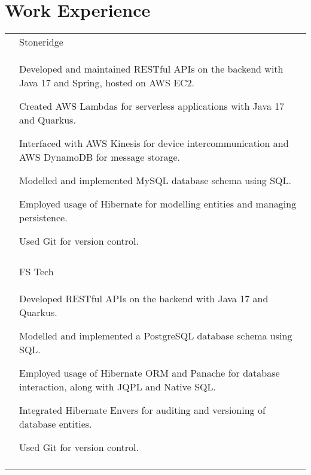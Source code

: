 \documentclass[a4paper,12pt]{article}
\begin{document}
\section{Work Experience}
\begin{longtable}{r|p{14.3cm}}

& Stoneridge \\*
&\small{
\begin{itemize*}[label=\Large\textbullet]
    \item Developed and maintained RESTful APIs on the backend with Java 17 and Spring, hosted on AWS EC2.
    \item Created AWS Lambdas for serverless applications with Java 17 and Quarkus.
    \item Interfaced with AWS Kinesis for device intercommunication and AWS DynamoDB for \mbox{message} storage.
    \item Modelled and implemented MySQL database schema using SQL.
    \item \mbox{Employed} usage of Hibernate for modelling entities and managing persistence.
    \item Used Git for version control.
    \end{itemize*}
}
\\ \\

 & FS Tech \\*
 &\small{
    \begin{itemize*}[label=\Large\textbullet]
        \item Developed RESTful APIs on the backend with Java 17 and Quarkus.
        \item Modelled and \mbox{implemented} a PostgreSQL database schema using SQL.
        \item Employed usage of Hibernate ORM and Panache for database interaction, along with JQPL and Native SQL.
        \item \mbox{Integrated} Hibernate Envers for auditing and versioning of database entities.
        \item Used Git for version control.
     \end{itemize*}
 }
 \\ \\



\end{longtable}
\end{document}
